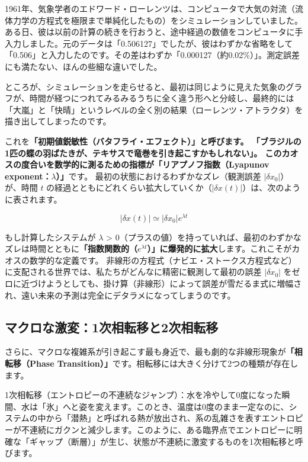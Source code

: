 1961年、気象学者のエドワード・ローレンツは、コンピュータで大気の対流（流体力学の方程式を極限まで単純化したもの）をシミュレーションしていました。 ある日、彼は以前の計算の続きを行おうと、途中経過の数値をコンピュータに手入力しました。元のデータは「0.506127」でしたが、彼はわずかな省略をして「0.506」と入力したのです。その差はわずか「0.000127（約0.02\%）」。測定誤差にも満たない、ほんの些細な違いでした。

ところが、シミュレーションを走らせると、最初は同じように見えた気象のグラフが、時間が経つにつれてみるみるうちに全く違う形へと分岐し、最終的には「大嵐」と「快晴」というレベルの全く別の結果（ローレンツ・アトラクタ）を描き出してしまったのです。

これを\textbf{「初期値鋭敏性（バタフライ・エフェクト）」と呼びます。 「ブラジルの1匹の蝶の羽ばたきが、テキサスで竜巻を引き起こすかもしれない」。 このカオスの度合いを数学的に測るための指標が「リアプノフ指数（Lyapunov exponent：\ensuremath{\lambda}）」}です。 最初の状態におけるわずかなズレ（観測誤差 \ensuremath{|\delta x_0|}）が、時間 \(t\) の経過とともにどれくらい拡大していくか（\ensuremath{|\delta x(t)|}）は、次のように表されます。

\[
|\delta x(t)| \simeq |\delta x_0| e^{\lambda t}
\]

もし計算したシステムが \ensuremath{\lambda} > 0（プラスの値）を持っていれば、最初のわずかなズレは時間とともに\textbf{「指数関数的（\ensuremath{e^{\lambda t}}）」に爆発的に拡大}します。これこそがカオスの数学的な定義です。 非線形の方程式（ナビエ・ストークス方程式など）に支配される世界では、私たちがどんなに精密に観測して最初の誤差 \ensuremath{|\delta x_0|} をゼロに近づけようとしても、掛け算（非線形）によって誤差が雪だるま式に増幅され、遠い未来の予測は完全にデタラメになってしまうのです。

\subsection{マクロな激変：1次相転移と2次相転移}

さらに、マクロな複雑系が引き起こす最も身近で、最も劇的な非線形現象が\textbf{「相転移（Phase Transition）」}です。相転移には大きく分けて2つの種類が存在します。

1次相転移（エントロピーの不連続なジャンプ）：水を冷やして0度になった瞬間、水は「氷」へと姿を変えます。このとき、温度は0度のまま一定なのに、システムの中から「潜熱」と呼ばれる熱が放出され、系の乱雑さを表すエントロピーが不連続にガクンと減少します。このように、ある臨界点でエントロピーに明確な「ギャップ（断層）」が生じ、状態が不連続に激変するものを1次相転移と呼びます。


